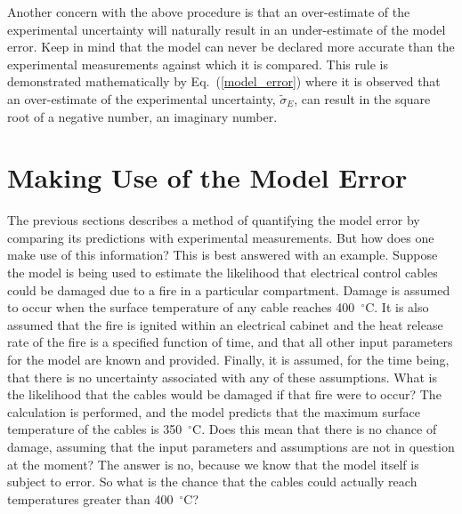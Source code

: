 Another concern with the above procedure is that an over-estimate of the experimental uncertainty will naturally result in an under-estimate of the model error. Keep
in mind that the model can never be declared more accurate than the experimental measurements against which it is compared. This rule is demonstrated
mathematically by Eq.~(\ref{model_error}) where it is observed that an over-estimate of the experimental uncertainty, $\tilde{\sigma}_E$, can result in
the square root of a negative number, an imaginary number.

\section{Making Use of the Model Error}

The previous sections describes a method of quantifying the model error by comparing its predictions with experimental measurements. But how does one make use of this
information? This is best answered with an example. Suppose the model is being used to estimate the likelihood that electrical control cables could be damaged due to
a fire in a particular compartment. Damage is assumed to occur when the surface temperature of any cable reaches 400~$^\circ$C. It is also assumed that the fire is
ignited within an electrical cabinet and the heat release rate of the fire is a specified function of time, and that all other input
parameters for the model are known and provided. Finally, it is assumed, for the time being, that there is no uncertainty
associated with any of these assumptions. What is the likelihood that the cables would be damaged if that fire were to occur? The calculation is performed, and the
model predicts that the maximum surface temperature of the cables is 350~$^\circ$C. Does this mean that there is no chance of damage, assuming that the input parameters
and assumptions are not in question at the moment? The answer is no, because we know that the model itself is subject to error. So what is the chance that the
cables could actually reach temperatures greater than 400~$^\circ$C?

